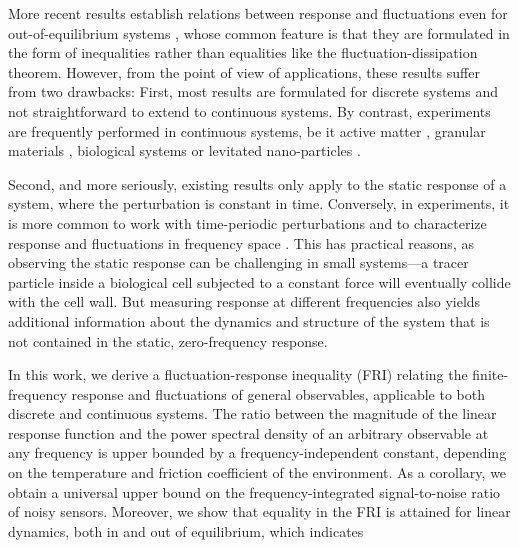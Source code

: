 \documentclass[aps,pre,twocolumn,superscriptaddress,notitlepage]{revtex4-2}
\begin{document}
More recent results establish relations between response and fluctuations even for out-of-equilibrium systems \cite{Dechant2020,Owen2020,FernandesMartins2023,Gao2024,Aslyamov2024,Ptaszynski2024,Liu2025,VanVu2025}, whose common feature is that they are formulated in the form of inequalities rather than equalities like the fluctuation-dissipation theorem.
However, from the point of view of applications, these results suffer from two drawbacks:
First, most results are formulated for discrete systems \cite{Owen2020,FernandesMartins2023,Aslyamov2024,Ptaszynski2024,VanVu2025} and not straightforward to extend to continuous systems.
By contrast, experiments are frequently performed in continuous systems, be it active matter \cite{Loi2011a,Fodor2016}, granular materials \cite{Song2005}, biological systems \cite{Sato2003,Chen2007,Mizuno2008} or levitated nano-particles \cite{Hempston2017,GonzalezBallestero2021}.

Second, and more seriously, existing results only apply to the static response of a system, where the perturbation is constant in time.
Conversely, in experiments, it is more common to work with time-periodic perturbations and to characterize response and fluctuations in frequency space \cite{Lau2003,Brau2007,Wilhelm2008,BenIsaac2011,Loi2011a}.
This has practical reasons, as observing the static response can be challenging in small systems---a tracer particle inside a biological cell subjected to a constant force will eventually collide with the cell wall.
But measuring response at different frequencies also yields additional information about the dynamics and structure of the system that is not contained in the static, zero-frequency response.

In this work, we derive a fluctuation-response inequality (FRI) relating the finite-frequency response and fluctuations of general observables, applicable to both discrete and continuous systems.
The ratio between the magnitude of the linear response function and the power spectral density of an arbitrary observable at any frequency is upper bounded by a frequency-independent constant, depending on the temperature and friction coefficient of the environment.
As a corollary, we obtain a universal upper bound on the frequency-integrated signal-to-noise ratio of noisy sensors.
Moreover, we show that equality in the FRI is attained for linear dynamics, both in and out of equilibrium, which indicates
\end{document}
